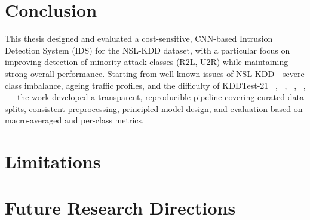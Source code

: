 \section{Conclusion}


\lipsum[2-3]

This thesis designed and evaluated a cost-sensitive, CNN-based Intrusion Detection System (IDS) for the NSL-KDD dataset, with a particular focus on improving detection of minority attack classes (R2L, U2R) while maintaining strong overall performance. Starting from well-known issues of NSL-KDD—severe class imbalance, ageing traffic profiles, and the difficulty of KDDTest-21 ~\cite{naseer2018enhanced}, ~\cite{li2017intrusion}, ~\cite{zamani2013machine}, ~\cite{alkasassbeh2018machine}, ~\cite{li2018machine}—the work developed a transparent, reproducible pipeline covering curated data splits, consistent preprocessing, principled model design, and evaluation based on macro-averaged and per-class metrics.


\section{Limitations}
\lipsum[1]


\section{Future Research Directions}
\lipsum[1]


